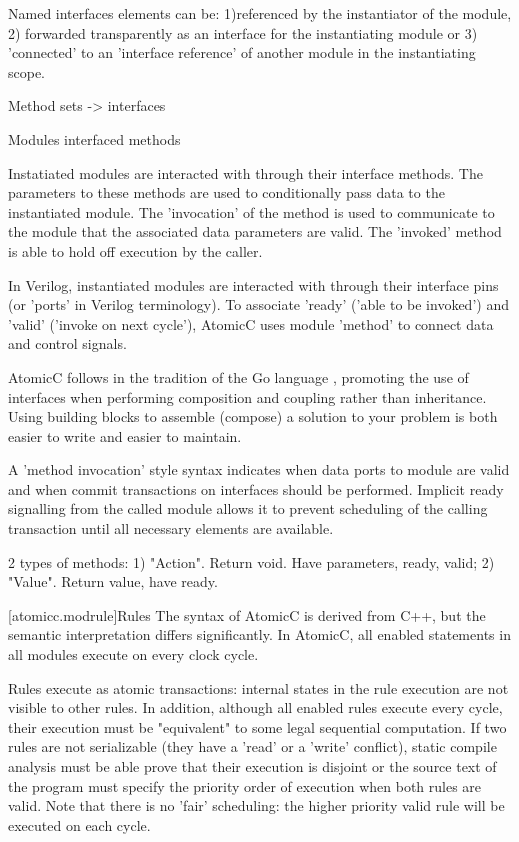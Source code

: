 Named interfaces elements can be: 1)referenced by the instantiator of the module,
2) forwarded transparently as an interface for the instantiating module or 3) 'connected'
to an 'interface reference' of another module in the instantiating scope.

Method sets -> interfaces

Modules interfaced methods

Instatiated modules are interacted with through their interface methods.  The parameters
to these methods are used to conditionally pass data to the instantiated module.
The 'invocation' of the method is used to communicate to the module that the associated
data parameters are valid.  The 'invoked' method is able to hold off execution by the
caller.

In Verilog, instantiated modules are interacted with through their interface pins
(or 'ports' in Verilog terminology).  To associate 'ready' ('able to be invoked')
and 'valid' ('invoke on next cycle'), AtomicC uses module 'method' to connect data
and control signals.

AtomicC follows in the tradition of the Go language \cite{Pike2012},
promoting the use of interfaces when performing composition and
coupling rather than inheritance.  Using building blocks to assemble (compose) a solution
to your problem is both easier to write and easier to maintain.

A 'method invocation' style syntax indicates when data ports to module
are valid and when commit transactions on interfaces should be performed.
Implicit ready signalling from the called module allows it to prevent
scheduling of the calling transaction until all necessary elements are
available.

2 types of methods: 1) "Action".  Return void. Have parameters, ready, valid; 2) "Value". Return value, have ready.

[atomicc.modrule]{Rules}
The syntax of AtomicC is derived from C++, but
the semantic interpretation differs significantly.
In AtomicC, all enabled statements in all modules execute on every clock cycle.

Rules execute as atomic transactions: internal states in the rule
execution are not visible to other rules.  In addition, although all enabled
rules execute every cycle, their execution must be 
"equivalent" to some legal sequential computation.
\cite{Lamport:1979:MMC:1311099.1311750}
If two rules are not serializable (they have a 'read' or a 'write' conflict),
static compile analysis must be able prove that their execution is disjoint
or the source text of the program must specify the priority order of execution
when both rules are valid.
Note that there is no 'fair' scheduling: the higher priority valid rule will
be executed on each cycle.

